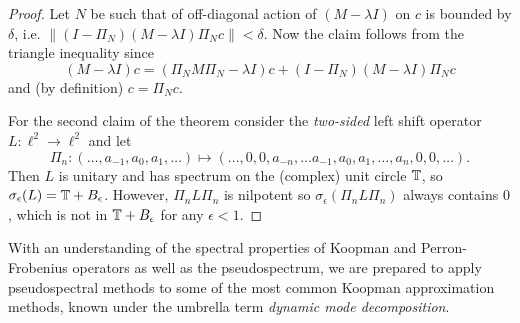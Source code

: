 \begin{proof}
    Let $N$ be such that of off-diagonal action of $(M - \lambda I)$ on $c$ is bounded by 
    $\delta$, i.e. $\left\| (I - \Pi_N) (M - \lambda I) \Pi_N c \right\| < \delta$. Now 
    the claim follows from the triangle inequality since
    \begin{equation}
        (M - \lambda I) c = (\Pi_N M \Pi_N - \lambda I) c + (I - \Pi_N) (M - \lambda I) \Pi_N c
    \end{equation}
    and (by definition) $c = \Pi_N c$. 

    For the second claim of the theorem consider the \emph{two-sided} left shift 
    operator $L : \ell^2 \to \ell^2$ and let 
    \begin{equation}
        \Pi_n : (\ldots, a_{-1}, a_0, a_1, \ldots) \mapsto 
        (\ldots, 0, 0, a_{-n}, \ldots a_{-1}, a_0, a_1, \ldots, a_n, 0, 0, \ldots) . 
    \end{equation}
    Then $L$ is unitary and has spectrum on the (complex) unit circle $\mathbb{T}$, so 
    $\sigma_\epsilon (L) = \mathbb{T} + B_\epsilon$. However, $\Pi_n L \Pi_n$ is nilpotent 
    so $\sigma_\epsilon (\Pi_n L \Pi_n)$ always contains $0$, which is not in 
    $\mathbb{T} + B_\epsilon$ for any $\epsilon < 1$. 
\end{proof}


With an understanding of the spectral properties of Koopman and Perron-Frobenius operators 
as well as the pseudospectrum, we are prepared to apply pseudospectral methods to some of 
the most common Koopman approximation methods, known under the umbrella term 
\emph{dynamic mode decomposition}. 


